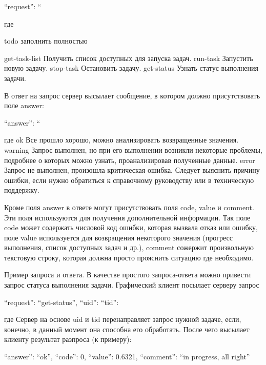         { “request”: “%
        
где %

todo заполнить полностью

get-task-list
	Получить список доступных для запуска задач.
	run-task
	Запустить новую задачу.
	stop-task
	Остановить задачу.
	get-status
	Узнать статус выполнения задачи.
	
В ответ на запрос сервер высылает сообщение, в котором должно присутствовать поле answer:
	
        { “answer”: “%
        
где %
ok
	Все прошло хорошо, можно анализировать возвращенные значения.
	warning
	Запрос выполнен, но при его выполнении возникли некоторые проблемы, подробнее о которых можно узнать, проанализировав полученные данные.
	error
	Запрос не выполнен, произошла критическая ошибка. Следует выяснить причину ошибки, если нужно обратиться к справочному руководству или в техническую поддержку.
	
	Кроме поля answer в ответе могут присутствовать поля code, value и comment. Эти поля используются для получения дополнительной информации. Так поле code может содержать числовой код ошибки, которая вызвала отказ или ошибку, поле value используется для возвращения некоторого значения (прогресс выполнения, список доступных задач и др.), comment сожержит произвольную текстовую строку, которая должна просто прояснить ситуацию где необходимо.
	
Пример запроса и ответа. В качестве простого запроса-ответа можно привести запрос статуса выполнения задачи. Графический клиент посылает серверу запрос

        {
“request”: “get-status”,
“uid”: %
“tid”: %
}

где %
Сервер на основе uid и tid перенаправляет запрос нужной задаче, если, конечно, в данный момент она способна его обработать. После чего высылает клиенту результат разпроса (к примеру):

    {
        “answer”: “ok”,
        “code”: 0,
        “value”: 0.6321,
        “comment”: “in progress, all right”
	}

}}
